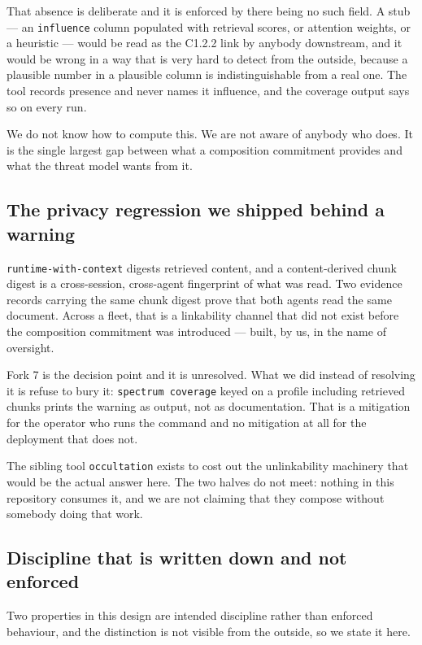 \documentclass[11pt]{article}
\begin{document}
That absence is deliberate and it is enforced by there being no such field. A
stub --- an \texttt{influence} column populated with retrieval scores, or
attention weights, or a heuristic --- would be read as the C1.2.2 link by
anybody downstream, and it would be wrong in a way that is very hard to detect
from the outside, because a plausible number in a plausible column is
indistinguishable from a real one. The tool records presence and never names
it influence, and the coverage output says so on every run.

We do not know how to compute this. We are not aware of anybody who does. It
is the single largest gap between what a composition commitment provides and
what the threat model wants from it.

\subsection{The privacy regression we shipped behind a warning}
\label{sec:privacy}

\texttt{runtime-with-context} digests retrieved content, and a content-derived
chunk digest is a cross-session, cross-agent fingerprint of what was read. Two
evidence records carrying the same chunk digest prove that both agents read
the same document. Across a fleet, that is a linkability channel that did not
exist before the composition commitment was introduced --- built, by us, in
the name of oversight.

Fork 7 is the decision point and it is unresolved. What we did instead of
resolving it is refuse to bury it: \texttt{spectrum coverage} keyed on a
profile including retrieved chunks prints the warning as output, not as
documentation. That is a mitigation for the operator who runs the command and
no mitigation at all for the deployment that does not.

The sibling tool \texttt{occultation} \cite{occultationtool} exists to cost
out the unlinkability machinery that would be the actual answer here. The two
halves do not meet: nothing in this repository consumes it, and we are not
claiming that they compose without somebody doing that work.

\subsection{Discipline that is written down and not enforced}

Two properties in this design are intended discipline rather than enforced
behaviour, and the distinction is not visible from the outside, so we state it
here.
\end{document}
